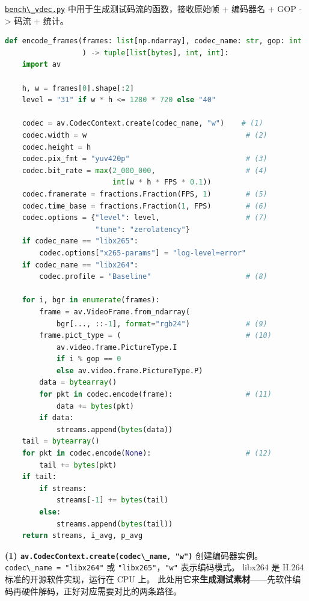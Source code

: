 \href{https://github.com/zhouxzh/Ascend310/blob/master/samples/chapter6/vdec/bench_vdec.py}{\passthrough{\lstinline!bench\_vdec.py!}}
中用于生成测试码流的函数，接收原始帧 + 编码器名 + GOP -\textgreater{}
码流 + 统计。

\begin{lstlisting}[language=Python]
def encode_frames(frames: list[np.ndarray], codec_name: str, gop: int
                  ) -> tuple[list[bytes], int, int]:
    import av

    h, w = frames[0].shape[:2]
    level = "31" if w * h <= 1280 * 720 else "40"

    codec = av.CodecContext.create(codec_name, "w")    # (1)
    codec.width = w                                     # (2)
    codec.height = h
    codec.pix_fmt = "yuv420p"                           # (3)
    codec.bit_rate = max(2_000_000,                     # (4)
                         int(w * h * FPS * 0.1))
    codec.framerate = fractions.Fraction(FPS, 1)        # (5)
    codec.time_base = fractions.Fraction(1, FPS)        # (6)
    codec.options = {"level": level,                    # (7)
                     "tune": "zerolatency"}
    if codec_name == "libx265":
        codec.options["x265-params"] = "log-level=error"
    if codec_name == "libx264":
        codec.profile = "Baseline"                      # (8)

    for i, bgr in enumerate(frames):
        frame = av.VideoFrame.from_ndarray(
            bgr[..., ::-1], format="rgb24")             # (9)
        frame.pict_type = (                             # (10)
            av.video.frame.PictureType.I
            if i % gop == 0
            else av.video.frame.PictureType.P)
        data = bytearray()
        for pkt in codec.encode(frame):                 # (11)
            data += bytes(pkt)
        if data:
            streams.append(bytes(data))
    tail = bytearray()
    for pkt in codec.encode(None):                      # (12)
        tail += bytes(pkt)
    if tail:
        if streams:
            streams[-1] += bytes(tail)
        else:
            streams.append(bytes(tail))
    return streams, i_avg, p_avg
\end{lstlisting}

\textbf{(1)
\passthrough{\lstinline!av.CodecContext.create(codec\_name, "w")!}}
创建编码器实例。\passthrough{\lstinline!codec\_name = "libx264"!} 或
\passthrough{\lstinline!"libx265"!}，\passthrough{\lstinline!"w"!}
表示编码模式。 libx264 是 H.264 标准的开源软件实现，运行在 CPU 上。
此处用它来\textbf{生成测试素材}------先软件编码再硬件解码，正好对应需要对比的两条路径。

